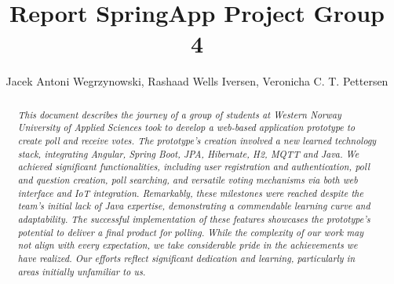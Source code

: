 \documentclass[11pt]{article}
\begin{document}
\title{Report SpringApp Project Group 4}

\author{Jacek Antoni Wegrzynowski, Rashaad Wells Iversen, Veronicha C. T. Pettersen }

\maketitle

\begin{abstract}

\noindent \textit{This document describes the journey of a group of students at Western Norway University of Applied Sciences took to develop a web-based application prototype to create poll and receive votes.  The prototype's creation involved a new learned technology stack, integrating Angular, Spring Boot, JPA, Hibernate, H2, MQTT and Java.  We achieved significant functionalities, including user registration and authentication, poll and question creation, poll searching, and versatile voting mechanisms via both web interface and IoT integration.  Remarkably, these milestones were reached despite the team's initial lack of Java expertise, demonstrating a commendable learning curve and adaptability.  The successful implementation of these features showcases the prototype's potential to deliver a final product for polling.  While the complexity of our work may not align with every expectation, we take considerable pride in the achievements we have realized.  Our efforts reflect significant dedication and learning, particularly in areas initially unfamiliar to us.}

\end{abstract}

%














{}
\end{document}
